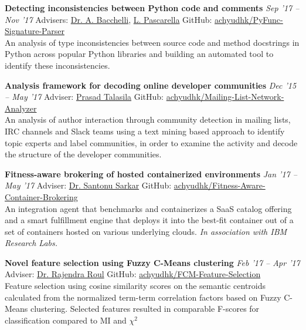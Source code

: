 \documentclass[10pt]{article}
\newcommand{\halfblankline}{\quad\vspace{-0.5\baselineskip}\pagebreak[3]}
\begin{document}
\textbf{Detecting inconsistencies between Python code and comments} \hfill \emph{Sep '17 -- 
Nov '17}
Advisers: \href{https://sback.it/}{Dr. A. Bacchelli}, \href{https://www.lucapascarella.com}{L. Pascarella} \hfill GitHub: \href{https://github.com/achyudhk/PyFunc-Signature-Parser}{achyudhk/PyFunc-Signature-Parser}
\vspace{0.5mm} \\
An analysis of type inconsistencies between source code and method docstrings in Python across popular Python libraries and building an automated tool to identify these inconsistencies.

\halfblankline

\textbf{Analysis framework for decoding online developer communities} \hfill \emph{Dec '15 -- 
May '17}
Adviser: \href{https://prasadtalasila.wordpress.com/}{Prasad Talasila} \hfill GitHub: \href{https://github.com/achyudhk/Mailing-List-Network-Analyzer}{achyudhk/Mailing-List-Network-Analyzer}
\vspace{0.5mm} \\
An analysis of author interaction through community detection in mailing lists, IRC channels and Slack teams using a text mining based approach to identify topic experts and label communities, in order to examine the activity and decode the structure of the developer communities.

\halfblankline

\textbf{Fitness-aware brokering of hosted containerized environments} \hfill \emph{Jan '17 -- May '17}
Adviser: \href{https://scholar.google.co.in/citations?user=8UNP6BIAAAAJ}{Dr. Santonu Sarkar} \hfill GitHub: \href{https://github.com/achyudhk/Fitness-Aware-Container-Brokering}{achyudhk/Fitness-Aware-Container-Brokering}
\vspace{0.5mm} \\
An integration agent that benchmarks and containerizes a SaaS catalog offering and a smart fulfillment engine that deploys it into the best-fit container out of a set of containers hosted on various underlying clouds. \textit{In association with IBM Research Labs.}

\halfblankline

\textbf{Novel feature selection using Fuzzy C-Means clustering} \hfill \emph{Feb '17 -- Apr '17}\\
Adviser: \href{http://www.bits-pilani.ac.in/goa/rkroul/Profile}{Dr. Rajendra Roul} \hfill GitHub: \href{https://github.com/achyudhk/FCM-Feature-Selection}{achyudhk/FCM-Feature-Selection}
\vspace{0.5mm} \\
Feature selection using cosine similarity scores on the semantic centroids calculated from the normalized term-term correlation factors based on Fuzzy C-Means clustering. Selected features resulted in comparable F-scores for classification compared to MI and $\chi^2$
\end{document}
